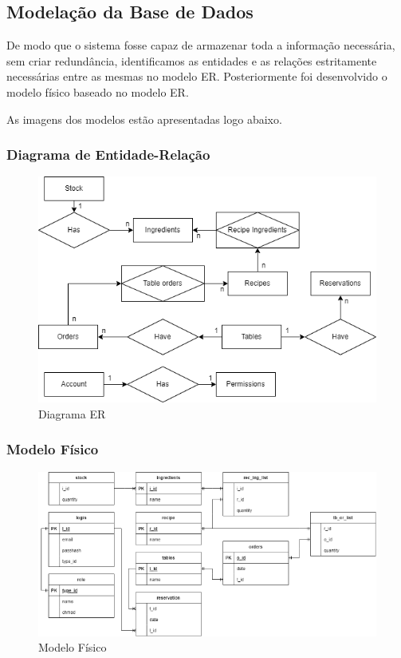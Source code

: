 \subsection{Modelação da Base de Dados}

De modo que o sistema fosse capaz de armazenar toda a informação necessária, sem criar redundância, identificamos as entidades e as relações estritamente necessárias entre as mesmas no modelo ER. Posteriormente foi desenvolvido o modelo físico baseado no modelo ER.

As imagens dos modelos estão apresentadas logo abaixo.

\subsubsection{Diagrama de Entidade-Relação}

\begin{figure}[!hbt]
    \centering
    \includegraphics[width=14cm]{Resources/Previous/image-112.png}
    \caption{Diagrama ER}
    
\end{figure}
\FloatBarrier

\subsubsection{Modelo Físico}

\begin{figure}[!hbt]
    \centering
    \includegraphics[width=14cm]{Resources/Previous/image-114.png}
    \caption{Modelo Físico}
    
\end{figure}
\FloatBarrier